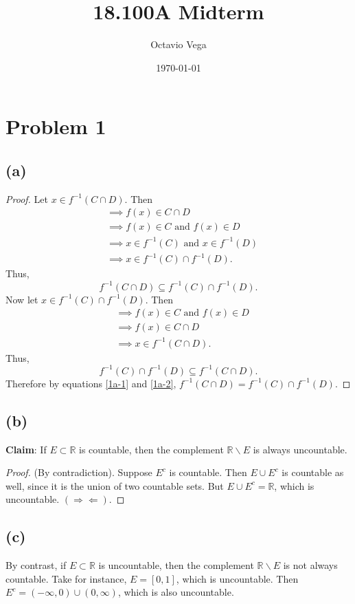 \documentclass{article}
\title{18.100A Midterm}
\author{Octavio Vega}
\date\today
\newcommand{\R}{\mathbb{R}} %
\begin{document}
\maketitle

\section*{Problem 1}
\subsection*{(a)}
\begin{proof}
Let $x \in f^{-1}(C \cap D)$. Then 
\begin{align}
	&\implies f(x) \in C \cap D \\
	&\implies f(x) \in C \textrm{ and } f(x) \in D \\
	&\implies x \in f^{-1}(C) \textrm{ and } x \in f^{-1}(D) \\
	&\implies x \in f^{-1}(C) \cap f^{-1}(D).
\end{align}
Thus, 
\begin{equation}\label{1a-1}
	f^{-1}(C \cap D) \subseteq f^{-1}(C) \cap f^{-1}(D).
\end{equation}
Now let $x \in f^{-1}(C) \cap f^{-1}(D)$. Then
\begin{align}
	&\implies f(x) \in C \textrm{ and } f(x) \in D \\
	&\implies f(x) \in C \cap D \\
	&\implies x \in f^{-1}(C \cap D).
\end{align}
Thus,
\begin{equation}\label{1a-2}
	 f^{-1}(C) \cap f^{-1}(D) \subseteq f^{-1}(C \cap D).
\end{equation}
Therefore by equations \eqref{1a-1} and \eqref{1a-2}, $f^{-1}(C \cap D) = f^{-1}(C) \cap f^{-1}(D)$.
\end{proof}

\subsection*{(b)}
\textbf{Claim}: If $E \subset \R$ is countable, then the complement $\R\backslash E$ is always uncountable.
\begin{proof}
	(By contradiction). Suppose $E^c$ is countable. Then $E \cup E^c$ is countable as well, since it is the union of two countable sets. But $E \cup E^c = \R$, which is uncountable. $(\Rightarrow\Leftarrow)$.
\end{proof}

\subsection*{(c)}
By contrast, if $E \subset \R$ is uncountable, then the complement $\R \backslash E$ is not always countable. Take for instance, $E = [0 , 1]$, which is uncountable. Then \\$E^c = (-\infty, 0) \cup (0, \infty)$, which is also uncountable.
\end{document}
